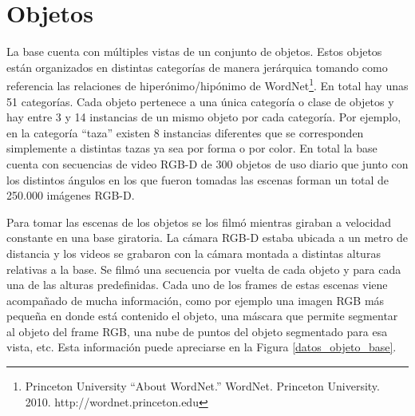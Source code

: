 \section{Objetos}
La base cuenta con múltiples vistas de un conjunto de objetos. Estos objetos están organizados en distintas categorías de manera jerárquica tomando como referencia las relaciones de hiperónimo/hipónimo de WordNet\footnote{Princeton University ``About WordNet.'' WordNet. Princeton University. 2010. http://wordnet.princeton.edu}. En total hay unas 51 categorías. Cada objeto pertenece a una única categoría o clase de objetos y hay entre 3 y 14 instancias de un mismo objeto por cada categoría. Por ejemplo, en la categoría ``taza'' existen 8 instancias diferentes que se corresponden simplemente a distintas tazas ya sea por forma o por color. En total la base cuenta con secuencias de video RGB-D de 300 objetos de uso diario que junto con los distintos ángulos en los que fueron tomadas las escenas forman un total de 250.000 imágenes RGB-D.

Para tomar las escenas de los objetos se los filmó mientras giraban a velocidad constante en una base giratoria. La cámara RGB-D estaba ubicada a un metro de distancia y los videos se grabaron con la cámara montada a distintas alturas relativas a la base. Se filmó una secuencia por vuelta de cada objeto y para cada una de las alturas predefinidas. Cada uno de los frames de estas escenas viene acompañado de mucha información, como por ejemplo una imagen RGB más pequeña en donde está contenido el objeto, una máscara que permite segmentar al objeto del frame RGB, una nube de puntos del objeto segmentado para esa vista, etc. Esta información puede apreciarse en la Figura \ref{datos_objeto_base}.

